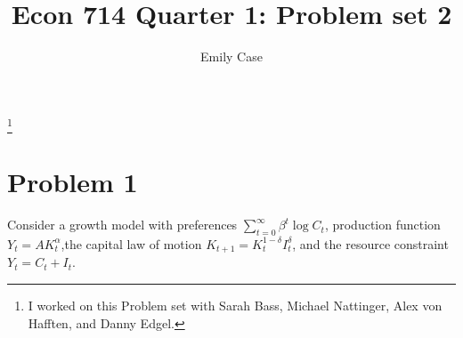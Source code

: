 \documentclass[]{article}
\title{Econ 714 Quarter 1: Problem set 2 }
\author{Emily Case}
\newcommand\blfootnote[1]{%
	\begingroup
	\renewcommand\thefootnote{}\footnote{#1}%
	\addtocounter{footnote}{-1}%
	\endgroup
}
\newcommand{\sumti}{\sum\limits_{t=0}^\infty} %
\begin{document}
	
	\maketitle
	
	\blfootnote{I worked on this Problem set with Sarah Bass, Michael Nattinger, Alex von Hafften, and Danny Edgel.} 



\section*{Problem 1}
Consider a growth model with preferences $\sumti \beta^t\log C_t$, production function $Y_t=AK_t^\alpha$,the capital law of motion $K_{t+1}=K_{t}^{1-\delta}I_t^\delta$, and the resource constraint $Y_t=C_t+I_t$.
\end{document}
